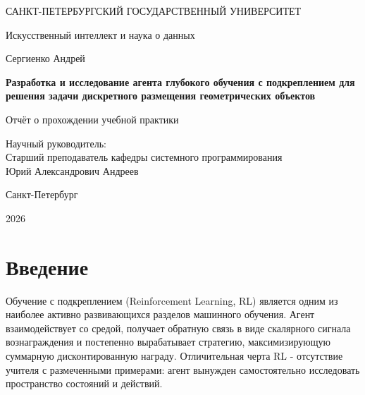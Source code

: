 \documentclass[12pt, a4paper]{article}
\begin{document}
\begin{titlepage}
	\centering
	
	{\large САНКТ-ПЕТЕРБУРГСКИЙ ГОСУДАРСТВЕННЫЙ УНИВЕРСИТЕТ\par}
	\vspace{0.5cm}
	{\large Искусственный интеллект и наука о данных\par}
	
	\vspace{4cm}
	
	{\large Сергиенко Андрей\par}
	
	\vspace{2cm}
	
	{\Large\bfseries Разработка и исследование агента глубокого обучения с подкреплением для решения задачи дискретного размещения геометрических объектов\par}
	
	\vspace{0.5cm}
	
	{\large Отчёт о прохождении учебной практики\par}
	
	\vfill
	
	\begin{flushright}
		Научный руководитель:\\
		Старший преподаватель кафедры системного программирования\\
		Юрий Александрович Андреев
	\end{flushright}
	
	\vfill
	
	{\large Санкт-Петербург\par}
	{\large 2026\par}
	
\end{titlepage}

\tableofcontents
\newpage

\section{Введение}

Обучение с подкреплением (Reinforcement Learning, RL) является одним из наиболее активно развивающихся разделов машинного обучения. Агент взаимодействует со средой, получает обратную связь в виде скалярного сигнала вознаграждения и постепенно вырабатывает стратегию, максимизирующую суммарную дисконтированную награду. Отличительная черта RL - отсутствие учителя с размеченными примерами: агент вынужден самостоятельно исследовать пространство состояний и действий.
\end{document}
